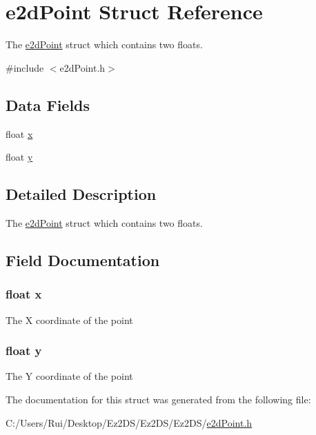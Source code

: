 \hypertarget{structe2d_point}{\section{e2d\-Point Struct Reference}
\label{structe2d_point}
}


The \hyperlink{structe2d_point}{e2d\-Point} struct which contains two floats.  




{\ttfamily \#include $<$e2d\-Point.\-h$>$}

\subsection*{Data Fields}
\begin{DoxyCompactItemize}
\item 
float \hyperlink{structe2d_point_ad0da36b2558901e21e7a30f6c227a45e}{x}
\item 
float \hyperlink{structe2d_point_aa4f0d3eebc3c443f9be81bf48561a217}{y}
\end{DoxyCompactItemize}


\subsection{Detailed Description}
The \hyperlink{structe2d_point}{e2d\-Point} struct which contains two floats. 

\subsection{Field Documentation}
\hypertarget{structe2d_point_ad0da36b2558901e21e7a30f6c227a45e}{
\subsubsection[{x}]{\setlength{\rightskip}{0pt plus 5cm}float {\bf x}}}\label{structe2d_point_ad0da36b2558901e21e7a30f6c227a45e}
The X coordinate of the point \hypertarget{structe2d_point_aa4f0d3eebc3c443f9be81bf48561a217}{
\subsubsection[{y}]{\setlength{\rightskip}{0pt plus 5cm}float {\bf y}}}\label{structe2d_point_aa4f0d3eebc3c443f9be81bf48561a217}
The Y coordinate of the point 

The documentation for this struct was generated from the following file\-:\begin{DoxyCompactItemize}
\item 
C\-:/\-Users/\-Rui/\-Desktop/\-Ez2\-D\-S/\-Ez2\-D\-S/\-Ez2\-D\-S/\hyperlink{e2d_point_8h}{e2d\-Point.\-h}\end{DoxyCompactItemize}
